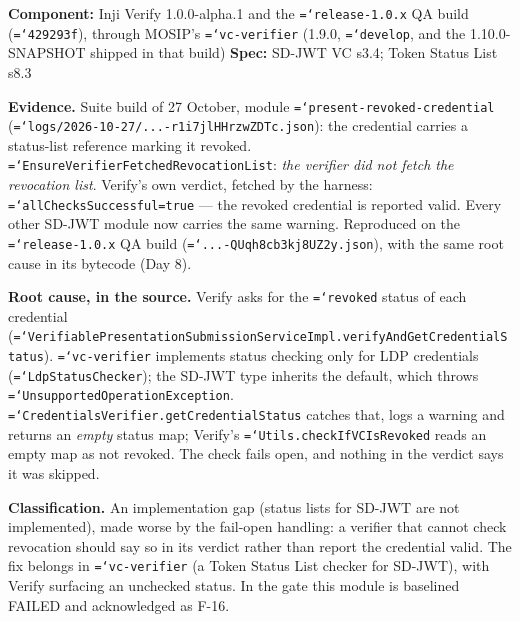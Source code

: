\documentclass[11pt,a4paper]{article}
\let\origtexttt\texttt
\renewcommand{\texttt}[1]{\origtexttt{\hyphenchar\font=`\-\relax #1}}
\renewcommand{\_}{\textunderscore\allowbreak}
\begin{document}
\textbf{Component:} Inji Verify 1.0.0-alpha.1 and the \texttt{release-1.0.x} QA build
(\texttt{429293f}), through MOSIP's \texttt{vc-verifier} (1.9.0, \texttt{develop}, and the
1.10.0-SNAPSHOT shipped in that build) \quad \textbf{Spec:} SD-JWT VC s3.4; Token
Status List s8.3

\textbf{Evidence.} Suite build of 27 October, module \texttt{present-revoked-credential}
(\texttt{logs/2026-10-27/...-r1i7jlHHrzwZDTc.json}): the credential carries a status-list
reference marking it revoked. \texttt{EnsureVerifierFetchedRevocationList}: \emph{the verifier did
not fetch the revocation list}. Verify's own verdict, fetched by the harness:
\texttt{allChecksSuccessful=true} --- the revoked credential is reported valid. Every other
SD-JWT module now carries the same warning. Reproduced on the \texttt{release-1.0.x} QA build
(\texttt{...-QUqh8cb3kj8UZ2y.json}), with the same root cause in its bytecode (Day 8).

\textbf{Root cause, in the source.} Verify asks for the \texttt{revoked} status of each credential
(\texttt{VerifiablePresentationSubmissionServiceImpl.verifyAndGetCredentialStatus}).
\texttt{vc-verifier} implements status checking only for LDP credentials
(\texttt{LdpStatusChecker}); the SD-JWT type inherits the default, which throws
\texttt{UnsupportedOperationException}. \texttt{CredentialsVerifier.getCredentialStatus} catches
that, logs a warning and returns an \emph{empty} status map; Verify's
\texttt{Utils.checkIfVCIsRevoked} reads an empty map as not revoked. The check fails open, and
nothing in the verdict says it was skipped.

\textbf{Classification.} An implementation gap (status lists for SD-JWT are not implemented),
made worse by the fail-open handling: a verifier that cannot check revocation should say so in
its verdict rather than report the credential valid. The fix belongs in \texttt{vc-verifier}
(a Token Status List checker for SD-JWT), with Verify surfacing an unchecked status. In the gate
this module is baselined FAILED and acknowledged as F-16.

\end{document}
